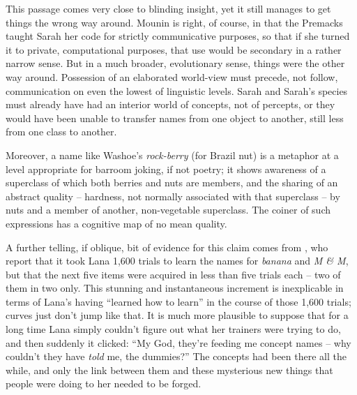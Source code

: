 This passage comes very close to blinding insight, yet it still manages to get things the wrong way around. Mounin is right, of course, in that the Premacks taught Sarah her code for strictly communicative purposes, so that if she turned it to private, computational purposes, that use would be secondary in a rather narrow sense. But in a much broader, evolutionary sense, things were the other way around. Possession of an elaborated world-view must precede, not follow, communication on even the lowest of linguistic levels. Sarah and Sarah's species must already have had an interior world of concepts, not of percepts, or they would have been unable to transfer names from one object to another, still less from one class to another.

Moreover, a name like Washoe's \textit{rock-berry} (for Brazil nut) is a metaphor at a level appropriate for barroom joking, if not poetry; it shows awareness of a superclass of which both berries and nuts are members, and the sharing of an abstract quality -- hardness, not normally associated with that superclass -- by nuts and a member of another, non-vegetable superclass. The coiner of such expressions has a cognitive map of no mean quality.

A further telling, if oblique, bit of evidence for this claim comes from \citet{RumbaughEtAl1976}, who report that it took Lana 1,600 trials to learn the names for \textit{banana} and \textit{M \& M}, but that the next five items were acquired in less than five trials each -- two of them in two only. This stunning and instantaneous increment is inexplicable in terms of Lana's having ``learned how to learn'' in the course of those 1,600 trials;  curves just don't jump like that. It is much more plausible to suppose that for a long time Lana simply couldn't figure out what her trainers were trying to do, and then suddenly it clicked: ``My God, they're feeding me concept names -- why couldn't they have \textit{told} me, the dummies?'' The concepts had been there all the while, and only the link between them and these mysterious new things that people were doing to her needed to be forged.

